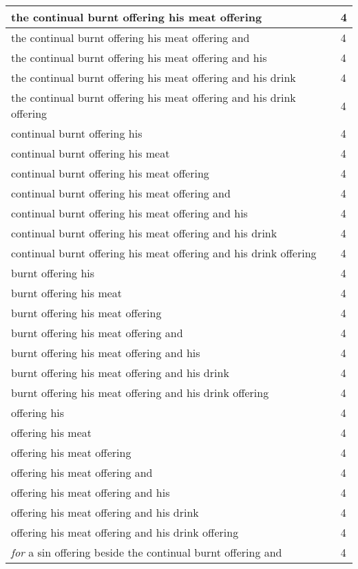 \begin{center}
\begin{longtable}{|p{3.0in}|p{0.5in}|}
the continual burnt offering his meat offering & 4\\ \hline 
the continual burnt offering his meat offering and & 4\\ \hline 
the continual burnt offering his meat offering and his & 4\\ \hline 
the continual burnt offering his meat offering and his drink & 4\\ \hline 
the continual burnt offering his meat offering and his drink offering & 4\\ \hline 
continual burnt offering his & 4\\ \hline 
continual burnt offering his meat & 4\\ \hline 
continual burnt offering his meat offering & 4\\ \hline 
continual burnt offering his meat offering and & 4\\ \hline 
continual burnt offering his meat offering and his & 4\\ \hline 
continual burnt offering his meat offering and his drink & 4\\ \hline 
continual burnt offering his meat offering and his drink offering & 4\\ \hline 
burnt offering his & 4\\ \hline 
burnt offering his meat & 4\\ \hline 
burnt offering his meat offering & 4\\ \hline 
burnt offering his meat offering and & 4\\ \hline 
burnt offering his meat offering and his & 4\\ \hline 
burnt offering his meat offering and his drink & 4\\ \hline 
burnt offering his meat offering and his drink offering & 4\\ \hline 
offering his & 4\\ \hline 
offering his meat & 4\\ \hline 
offering his meat offering & 4\\ \hline 
offering his meat offering and & 4\\ \hline 
offering his meat offering and his & 4\\ \hline 
offering his meat offering and his drink & 4\\ \hline 
offering his meat offering and his drink offering & 4\\ \hline 
\emph{for} a sin offering beside the continual burnt offering and & 4\\ \hline 

\end{longtable}
\end{center}
